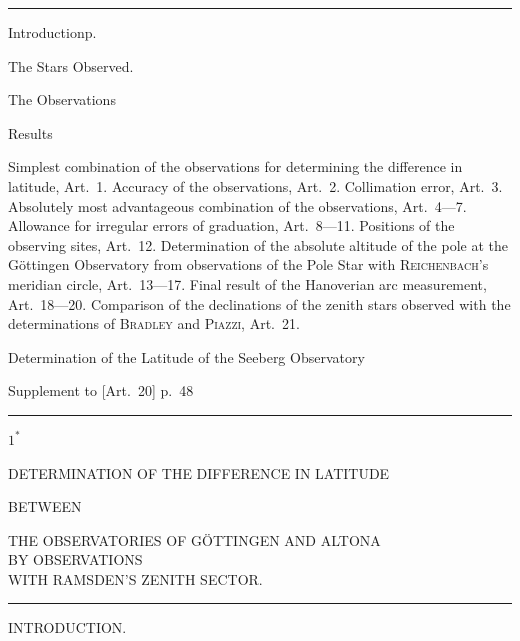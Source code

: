 \clearpage
\begin{center}
{\LARGE{}}\par\medskip
\rule{.09\textwidth}{.4pt}
\end{center}
\noindent Introduction\dotfill p.\par
\noindent{}\quad The Stars Observed.\dotfill \quotedblbase{}\par
\noindent{}\quad The Observations\dotfill \quotedblbase{}\par
\noindent{}\quad Results\dotfill \quotedblbase{}\par
\noindent\hspace*{12mm}\begin{minipage}{\dimexpr\textwidth-24mm\relax}
Simplest combination of the observations for determining the difference in latitude, Art.\ 1.
Accuracy of the observations, Art.\ 2. Collimation error, Art.\ 3.
Absolutely most advantageous combination of the observations, Art.\ 4---7.
Allowance for irregular errors of graduation, Art.\ 8---11. Positions of the observing sites, Art.\ 12.
Determination of the absolute altitude of the pole at the Göttingen Observatory from observations
of the Pole Star with \textsc{Reichenbach}'s meridian circle, Art.\ 13---17.
Final result of the Hanoverian arc measurement, Art.\ 18---20.
Comparison of the declinations of the zenith stars observed with the determinations
of \textsc{Bradley} and \textsc{Piazzi}, Art.\ 21.
\end{minipage}\par
\noindent{}\quad Determination of the Latitude of the Seeberg Observatory\dotfill \quotedblbase{}\par
\noindent Supplement to [Art.\ 20] p.\ 48\dotfill \quotedblbase{}\par
\begin{center}\rule{.23\textwidth}{.4pt}\end{center}
\vfill\begin{flushright}$1^{\ast}$\end{flushright}

\clearpage
\null

\clearpage
\vspace*{12mm}
\begin{center}
{\large DETERMINATION OF THE DIFFERENCE IN LATITUDE}\par\medskip
{\small BETWEEN}\par\medskip
{\large THE OBSERVATORIES OF GÖTTINGEN AND ALTONA\\
BY OBSERVATIONS\\
WITH RAMSDEN'S ZENITH SECTOR.}\par\medskip
\rule{.12\textwidth}{.4pt}\par\bigskip
{\large INTRODUCTION.}
\end{center}

